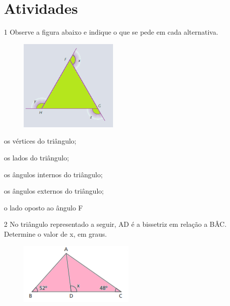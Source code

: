 \section{Atividades}

\num{1} Observe a figura abaixo e indique o que se pede em cada alternativa.

\begin{figure}[H]
\centering\includegraphics[width=1.88333in,height=1.75048in]{./imgSAEB_8_MAT/media/image13.png}
\end{figure}

\begin{multicols}{3}
\begin{escolha}[itemsep=0pt]
\item os vértices do triângulo;
\item os lados do triângulo;
\item os ângulos internos do triângulo;
\item os ângulos externos do triângulo;
\item o lado oposto ao ângulo F
\end{escolha}
\end{multicols}




\num{2} No triângulo representado a seguir, AD é a bissetriz em relação a
BÂC. Determine o valor de x, em graus.

\begin{figure}[H]
\centering\includegraphics[width=2.20833in,height=1.1875in]{./imgSAEB_8_MAT/media/image14.png}
\end{figure}

